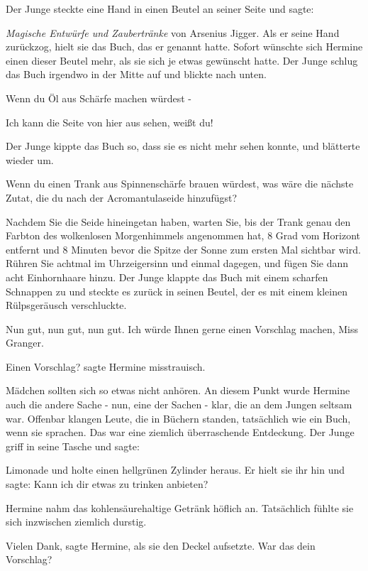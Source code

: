 Der Junge steckte eine Hand in einen Beutel an seiner Seite und sagte:

\emph{\glqq Magische Entwürfe und Zaubertränke} von Arsenius Jigger\grqq{}. Als
er seine Hand zurückzog, hielt sie das Buch, das er genannt hatte. Sofort
wünschte sich Hermine einen dieser Beutel mehr, als sie sich je etwas gewünscht
hatte. Der Junge schlug das Buch irgendwo in der Mitte auf und blickte nach
unten.

\glqq Wenn du Öl aus Schärfe machen würdest -\grqq{}

\glqq Ich kann die Seite von hier aus sehen, weißt du!\grqq{}

Der Junge kippte das Buch so, dass sie es nicht mehr sehen konnte, und blätterte
wieder um.

\glqq Wenn du einen Trank aus Spinnenschärfe brauen würdest, was wäre die
nächste Zutat, die du nach der Acromantulaseide hinzufügst?\grqq{}

\glqq Nachdem Sie die Seide hineingetan haben, warten Sie, bis der Trank genau
den Farbton des wolkenlosen Morgenhimmels angenommen hat, 8 Grad vom Horizont
entfernt und 8 Minuten bevor die Spitze der Sonne zum ersten Mal sichtbar wird.
Rühren Sie achtmal im Uhrzeigersinn und einmal dagegen, und fügen Sie dann acht
Einhornhaare hinzu.\grqq{} Der Junge klappte das Buch mit einem scharfen
Schnappen zu und steckte es zurück in seinen Beutel, der es mit einem kleinen
Rülpsgeräusch verschluckte.

\glqq Nun gut, nun gut, nun gut. Ich würde Ihnen gerne einen Vorschlag machen,
Miss Granger.\grqq{}

\glqq Einen Vorschlag?\grqq{} sagte Hermine misstrauisch.

Mädchen sollten sich so etwas nicht anhören. An diesem Punkt wurde Hermine auch
die andere Sache - nun, eine der Sachen - klar, die an dem Jungen seltsam war.
Offenbar klangen Leute, die in Büchern standen, tatsächlich wie ein Buch, wenn
sie sprachen. Das war eine ziemlich überraschende Entdeckung. Der Junge griff in
seine Tasche und sagte:

\glqq Limonade\grqq{} und holte einen hellgrünen Zylinder heraus. Er hielt sie
ihr hin und sagte: \glqq Kann ich dir etwas zu trinken anbieten?\grqq{}

Hermine nahm das kohlensäurehaltige Getränk höflich an. Tatsächlich fühlte sie
sich inzwischen ziemlich durstig.

\glqq Vielen Dank\grqq{}, sagte Hermine, als sie den Deckel aufsetzte. \glqq War
das dein Vorschlag?\grqq{}

